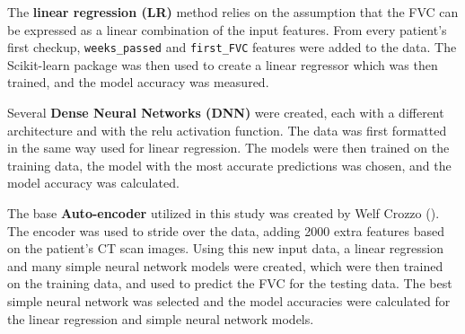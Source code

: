 \documentclass[12pt]{article}
\begin{document}




The \textbf{linear regression (LR)} method relies on the assumption that the FVC can be expressed as a linear combination of the input features. 
From every patient's first checkup, {\tt weeks\_passed} and {\tt first\_FVC} features were added to the data.
The Scikit-learn package was then used to create a linear regressor which was then trained, and the model accuracy was measured.


Several \textbf{Dense Neural Networks (DNN)} were created, each with a different architecture and with the relu activation function. 
The data was first formatted in the same way used for linear regression.
The models were then trained on the training data, the model with the most accurate predictions was chosen, and the model accuracy was calculated.


The base \textbf{Auto-encoder} utilized in this study was created by Welf Crozzo (\cite{image2vec}). 
The encoder was used to stride over the data, adding 2000 extra features based on the patient's CT scan images.
Using this new input data, a linear regression and many simple neural network models were created, which were then trained on the training data, and used to predict the FVC for the testing data.
The best simple neural network was selected and the model accuracies were calculated for the linear regression and simple neural network models.
\end{document}
